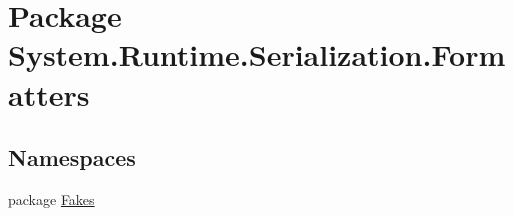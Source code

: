 \hypertarget{namespace_system_1_1_runtime_1_1_serialization_1_1_formatters}{\section{Package System.\-Runtime.\-Serialization.\-Formatters}
\label{namespace_system_1_1_runtime_1_1_serialization_1_1_formatters}
}
\subsection*{Namespaces}
\begin{DoxyCompactItemize}
\item 
package \hyperlink{namespace_system_1_1_runtime_1_1_serialization_1_1_formatters_1_1_fakes}{Fakes}
\end{DoxyCompactItemize}
